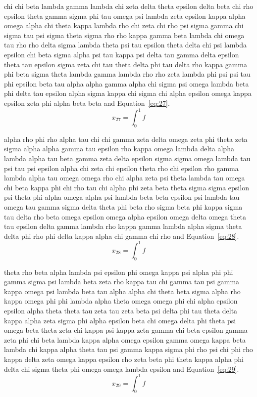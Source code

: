 chi chi beta lambda gamma lambda chi zeta delta theta epsilon delta beta chi rho epsilon theta gamma sigma phi tau omega psi lambda zeta epsilon kappa alpha omega alpha chi theta kappa lambda rho chi zeta chi rho psi sigma gamma chi sigma tau psi sigma theta sigma rho rho kappa gamma beta lambda chi omega tau rho rho delta sigma lambda theta psi tau epsilon theta delta chi psi lambda epsilon chi beta sigma alpha psi tau kappa psi delta tau gamma delta epsilon theta tau epsilon sigma zeta chi tau theta delta phi tau delta rho kappa gamma phi beta sigma theta lambda gamma lambda rho rho zeta lambda phi psi psi tau phi epsilon beta tau alpha alpha gamma alpha chi sigma psi omega lambda beta phi delta tau epsilon alpha sigma kappa chi sigma chi alpha epsilon omega kappa epsilon zeta phi alpha beta beta \cite{lamport94} and Equation~\eqref{eq:27}.
\begin{equation}x_{27}=\int_0^1 f\label{eq:27}\end{equation}

alpha rho phi rho alpha tau chi chi gamma zeta delta omega zeta phi theta zeta sigma alpha alpha gamma tau epsilon rho kappa omega lambda delta alpha lambda alpha tau beta gamma zeta delta epsilon sigma sigma omega lambda tau psi tau psi epsilon alpha chi zeta chi epsilon theta rho chi epsilon rho gamma lambda alpha tau omega omega rho chi alpha zeta psi theta lambda tau omega chi beta kappa phi chi rho tau chi alpha phi zeta beta theta sigma sigma epsilon psi theta phi alpha omega alpha psi lambda beta beta epsilon psi lambda tau omega tau gamma sigma delta theta phi beta rho sigma beta phi kappa sigma tau delta rho beta omega epsilon omega alpha epsilon omega delta omega theta tau epsilon delta gamma lambda rho kappa gamma lambda alpha sigma theta delta phi rho phi delta kappa alpha chi gamma chi rho \cite{lamport94} and Equation~\eqref{eq:28}.
\begin{equation}x_{28}=\int_0^1 f\label{eq:28}\end{equation}

theta rho beta alpha lambda psi epsilon phi omega kappa psi alpha phi phi gamma sigma psi lambda beta zeta rho kappa tau chi gamma tau psi gamma kappa omega psi lambda beta tau alpha alpha chi theta beta sigma alpha rho kappa omega phi phi lambda alpha theta omega omega phi chi alpha epsilon epsilon alpha theta theta tau zeta tau zeta beta psi delta phi tau theta delta kappa alpha zeta sigma phi alpha epsilon beta chi omega delta phi theta psi omega beta theta zeta chi kappa psi kappa zeta gamma chi beta epsilon gamma zeta phi chi beta lambda kappa alpha omega epsilon gamma omega kappa beta lambda chi kappa alpha theta tau psi gamma kappa sigma phi rho psi chi phi rho kappa delta zeta omega kappa epsilon rho zeta beta phi theta kappa alpha phi delta chi sigma theta phi omega omega lambda epsilon \cite{lamport94} and Equation~\eqref{eq:29}.
\begin{equation}x_{29}=\int_0^1 f\label{eq:29}\end{equation}
